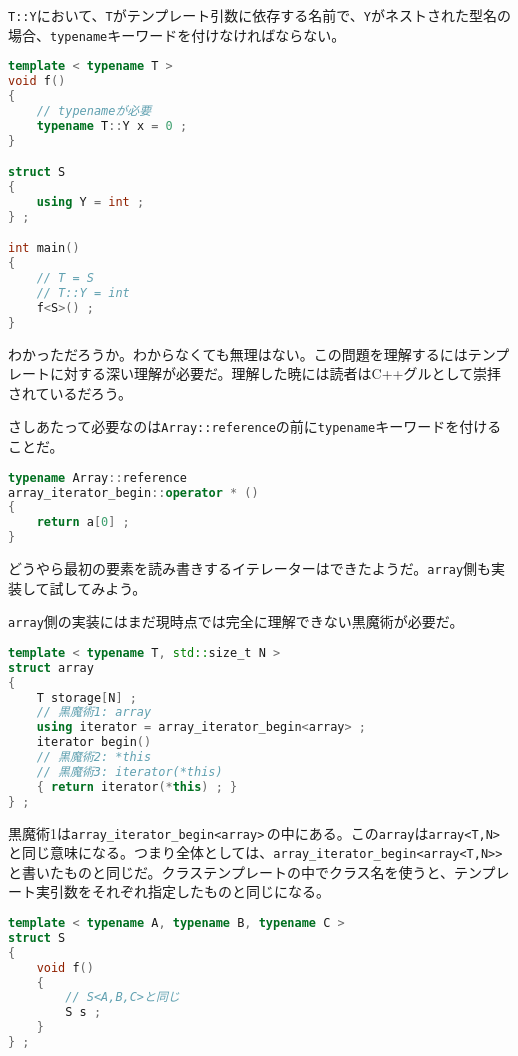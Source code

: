 \texttt{T::Y}において、\texttt{T}がテンプレート引数に依存する名前で、\texttt{Y}がネストされた型名の場合、\texttt{typename}キーワードを付けなければならない。

\begin{lstlisting}[language={C++}]
template < typename T >
void f()
{
    // typenameが必要
    typename T::Y x = 0 ;
}

struct S
{
    using Y = int ;
} ;

int main()
{
    // T = S
    // T::Y = int
    f<S>() ;
}
\end{lstlisting}

わかっただろうか。わからなくても無理はない。この問題を理解するにはテンプレートに対する深い理解が必要だ。理解した暁には読者はC++グルとして崇拝されているだろう。

さしあたって必要なのは\texttt{Array::reference}の前に\texttt{typename}キーワードを付けることだ。

\begin{lstlisting}[language={C++}]
typename Array::reference
array_iterator_begin::operator * ()
{
    return a[0] ;
}
\end{lstlisting}

どうやら最初の要素を読み書きするイテレーターはできたようだ。\texttt{array}側も実装して試してみよう。

\texttt{array}側の実装にはまだ現時点では完全に理解できない黒魔術が必要だ。

\begin{lstlisting}[language={C++}]
template < typename T, std::size_t N >
struct array
{
    T storage[N] ;
    // 黒魔術1: array
    using iterator = array_iterator_begin<array> ;
    iterator begin()
    // 黒魔術2: *this
    // 黒魔術3: iterator(*this)
    { return iterator(*this) ; }
} ;
\end{lstlisting}

黒魔術1は\texttt{array\_iterator\_begin<array>}\,の中にある。この\texttt{array}は\texttt{array<T,N>}\,と同じ意味になる。つまり全体としては、\texttt{array\_iterator\_begin<array<T,N{>}{>}}\,と書いたものと同じだ。クラステンプレートの中でクラス名を使うと、テンプレート実引数をそれぞれ指定したものと同じになる。

\begin{lstlisting}[language={C++}]
template < typename A, typename B, typename C >
struct S
{
    void f()
    {
        // S<A,B,C>と同じ
        S s ;
    }
} ;
\end{lstlisting}

